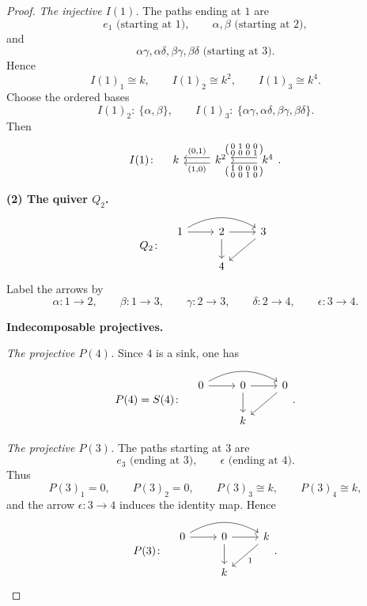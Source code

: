 \documentclass[11pt, a4paper]{article}
\begin{document}
\begin{enumerate}[leftmargin=*, label=\textbf{\arabic*.}]
\begin{proof}
    \smallskip
    \noindent\emph{The injective $I(1)$.}
    The paths ending at $1$ are
    \[
    e_1 \text{ (starting at $1$)},\qquad
    \alpha,\beta \text{ (starting at $2$)},
    \]
    and
    \[
    \alpha\gamma,\alpha\delta,\beta\gamma,\beta\delta \text{ (starting at $3$)}.
    \]
    Hence
    \[
    I(1)_1\cong k,\qquad I(1)_2\cong k^2,\qquad I(1)_3\cong k^4.
    \]
    Choose the ordered bases
    \[
    I(1)_2:\ \{\alpha,\beta\},
    \qquad
    I(1)_3:\ \{\alpha\gamma,\alpha\delta,\beta\gamma,\beta\delta\}.
    \]
    Then
    \[
    I(1)\colon\quad
    \begin{tikzcd}[ampersand replacement=\&]
    k
    \&
    k^2 \arrow[l, "{(1,0)}", shift left]
        \arrow[l, "{(0,1)}"', shift right]
    \&
    k^4 \arrow[l, "{\begin{psmallmatrix}
    1&0&0&0\\
    0&0&1&0
    \end{psmallmatrix}}", shift left]
        \arrow[l, "{\begin{psmallmatrix}
    0&1&0&0\\
    0&0&0&1
    \end{psmallmatrix}}"', shift right]
    \end{tikzcd}.
    \]
    
    \bigskip
    \noindent\textbf{(2) The quiver $Q_2$.}
    \[
    Q_2 \colon \quad
    \begin{tikzcd}
    1 \arrow[r] \arrow[rr, bend left] & 2 \arrow[r] \arrow[d] & 3 \arrow[ld] \\
                                      & 4 &
    \end{tikzcd}
    \]
    Label the arrows by
    \[
    \alpha\colon 1\to 2,\qquad
    \beta\colon 1\to 3,\qquad
    \gamma\colon 2\to 3,\qquad
    \delta\colon 2\to 4,\qquad
    \epsilon\colon 3\to 4.
    \]
    
    \medskip
    \noindent\textbf{Indecomposable projectives.}
    
    \smallskip
    \noindent\emph{The projective $P(4)$.}
    Since $4$ is a sink, one has
    \[
    P(4)=S(4)\colon\quad
    \begin{tikzcd}
    0 \arrow[r] \arrow[rr, bend left] & 0 \arrow[r] \arrow[d] & 0 \arrow[ld] \\
                                      & k &
    \end{tikzcd}.
    \]
    
    \smallskip
    \noindent\emph{The projective $P(3)$.}
    The paths starting at $3$ are
    \[
    e_3 \text{ (ending at $3$)},\qquad \epsilon \text{ (ending at $4$)}.
    \]
    Thus
    \[
    P(3)_1=0,\qquad P(3)_2=0,\qquad P(3)_3\cong k,\qquad P(3)_4\cong k,
    \]
    and the arrow $\epsilon\colon 3\to 4$ induces the identity map. Hence
    \[
    P(3)\colon\quad
    \begin{tikzcd}
    0 \arrow[r] \arrow[rr, bend left] & 0 \arrow[r] \arrow[d] & k \arrow[ld, "1"] \\
                                      & k &
    \end{tikzcd}.
    \]
    

\end{proof}
\end{enumerate}
\end{document}
